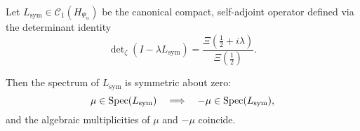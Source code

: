 \begin{lemma}
\label{lem:spectral-symmetry}
Let \( L_{\mathrm{sym}} \in \mathcal{C}_1(H_{\Psi_\alpha}) \) be the canonical compact, self-adjoint operator defined via the determinant identity
\[
\det\nolimits_\zeta(I - \lambda L_{\mathrm{sym}}) = \frac{\Xi(\tfrac{1}{2} + i\lambda)}{\Xi(\tfrac{1}{2})}.
\]

Then the spectrum of \( L_{\mathrm{sym}} \) is symmetric about zero:
\[
\mu \in \operatorname{Spec}(L_{\mathrm{sym}}) \quad \Longrightarrow \quad -\mu \in \operatorname{Spec}(L_{\mathrm{sym}}),
\]
and the algebraic multiplicities of \( \mu \) and \( -\mu \) coincide.
\end{lemma}
%  